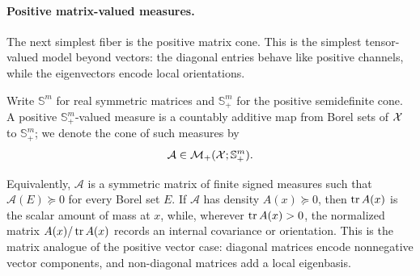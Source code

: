 \paragraph{Positive matrix-valued measures.}
The next simplest fiber is the positive matrix cone. This is the simplest tensor-valued model beyond vectors: the diagonal entries behave like positive channels, while the eigenvectors encode local orientations.

\begin{defn}\label{def-positive-matrix-valued-measure}
	Write $\mathbb S^m$ for real symmetric matrices and $\mathbb S_+^m$ for the positive semidefinite cone. A positive $\mathbb S_+^m$-valued measure is a countably additive map from Borel sets of $\mathcal{X}$ to $\mathbb S_+^m$; we denote the cone of such measures by
	\[
		\mathcal A\in\mathcal{M}_+(\mathcal{X};\mathbb S_+^m).
	\]
\end{defn}
Equivalently, $\mathcal A$ is a symmetric matrix of finite signed measures such that $\mathcal A(E)\succeq0$ for every Borel set $E$. If $\mathcal A$ has density $A(x)\succeq0$, then $\operatorname{tr} A(x)$ is the scalar amount of mass at $x$, while, wherever $\operatorname{tr} A(x)>0$, the normalized matrix $A(x)/\operatorname{tr} A(x)$ records an internal covariance or orientation. This is the matrix analogue of the positive vector case: diagonal matrices encode nonnegative vector components, and non-diagonal matrices add a local eigenbasis.

